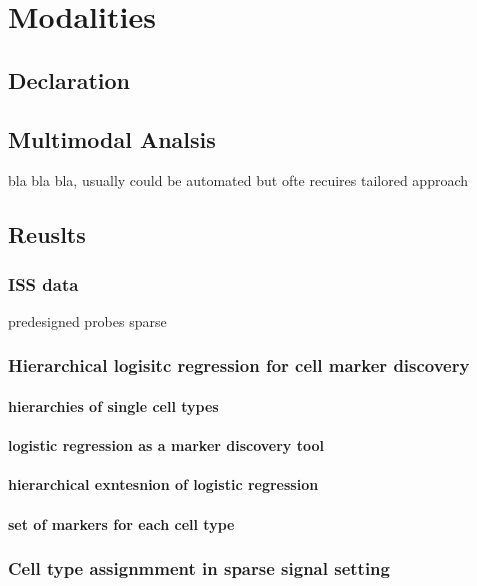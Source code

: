 \chapter{Modalities}
\label{sec:chapter-basiss-multimodal}

\section*{Declaration}

\section{Multimodal Analsis}

bla bla bla, usually could be automated but ofte recuires tailored approach

\section{Reuslts}

\subsection{\acl{ISS} data}
predesigned probes
sparse

\subsection{Hierarchical logisitc regression for cell marker discovery}
\subsubsection*{hierarchies of single cell types}
\subsubsection*{logistic regression as a marker discovery tool}
\subsubsection*{hierarchical exntesnion of logistic regression}
\subsubsection*{set of markers for each cell type}

\subsection{Cell type assignmment in sparse signal setting}

